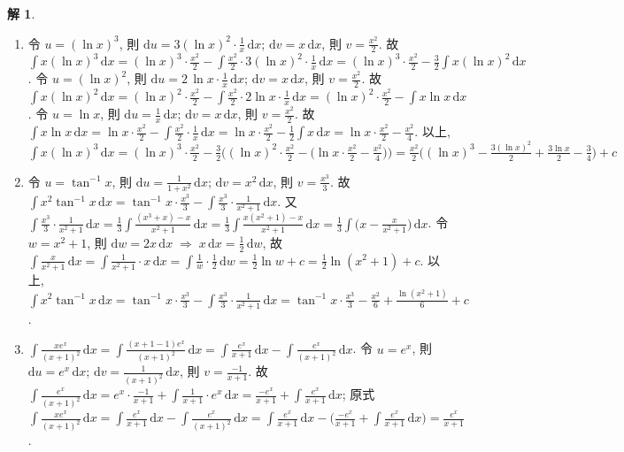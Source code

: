 \documentclass[12pt]{extarticle}
\newcommand{\ds}{\displaystyle}
\newcommand{\ie}{\;\Longrightarrow\;}
\theoremstyle{definition}
\newtheorem*{sol}{解}
\begin{document}
\begin{sol}
\begin{enumerate}
    \item 令 $\ds u = (\ln x)^3$, 則 $\ds\text{d}u = 3(\ln x)^2\cdot\frac{1}{x}\,\text{d}x$; $\ds\text{d}v = x\,\text{d}x$, 則 $\ds v = \frac{x^2}{2}$.  故 $\ds\int x(\ln x)^3\,\text{d}x = (\ln x)^3\cdot\frac{x^2}{2} - \int\!\frac{x^2}{2}\cdot 3(\ln x)^2\cdot\frac{1}{x}\,\text{d}x = (\ln x)^3\cdot\frac{x^2}{2} - \frac{3}{2}\int x(\ln x)^2\,\text{d}x$. 令 $\ds u = (\ln x)^2$, 則 $\ds\text{d}u = 2\,\ln x\cdot\frac{1}{x}\,\text{d}x$; $\ds\text{d}v = x\,\text{d}x$, 則 $\ds v = \frac{x^2}{2}$.  故 $\ds\int x(\ln x)^2\,\text{d}x = (\ln x)^2\cdot\frac{x^2}{2} - \int\!\frac{x^2}{2}\cdot 2\ln x\cdot\frac{1}{x}\,\text{d}x = (\ln x)^2\cdot\frac{x^2}{2} - \int x\ln x\,\text{d}x$. 令 $\ds u = \ln x$, 則 $\ds\text{d}u = \frac{1}{x}\,\text{d}x$; $\ds\text{d}v = x\,\text{d}x$, 則 $\ds v = \frac{x^2}{2}$. 故 $\ds\int x\ln x\,\text{d}x = \ln x\cdot\frac{x^2}{2} - \int\!\frac{x^2}{2}\cdot\frac{1}{x}\,\text{d}x = \ln x\cdot\frac{x^2}{2} - \frac{1}{2}\int x\,\text{d}x = \ln x\cdot\frac{x^2}{2} - \frac{x^2}{4}$. 以上, $\ds\int x(\ln x)^3\,\text{d}x = (\ln x)^3\cdot\frac{x^2}{2} - \frac{3}{2}\Big((\ln x)^2\cdot\frac{x^2}{2} - \big(\ln x\cdot\frac{x^2}{2} - \frac{x^2}{4}\big)\Big) = \frac{x^2}{2}\big((\ln x)^3 - \frac{3(\ln x)^2}{2} + \frac{3\ln x}{2} - \frac{3}{4}\big) + c$
    \item 令 $\ds u = \tan^{-1} x$, 則 $\ds\text{d}u = \frac{1}{1 + x^2}\,\text{d}x$; $\ds\text{d}v = x^2\,\text{d}x$, 則 $\ds v = \frac{x^3}{3}$.  故 $\ds\int x^2\tan^{-1} x\,\text{d}x = \tan^{-1}x\cdot\frac{x^3}{3} - \int\!\frac{x^3}{3}\cdot\frac{1}{x^2 + 1}\,\text{d}x$. 又 $\ds\int\!\frac{x^3}{3}\cdot\frac{1}{x^2 + 1}\,\text{d}x = \frac{1}{3}\int\!\frac{(x^3 + x) - x}{x^2 + 1}\,\text{d}x = \frac{1}{3}\int\!\frac{x(x^2 + 1) - x}{x^2 + 1}\,\text{d}x = \frac{1}{3}\int\!\big(x - \frac{x}{x^2 + 1}\big)\,\text{d}x$. 令 $\ds w = x^2 + 1$, 則 $\ds\text{d}w = 2x\,\text{d}x\ie x\,\text{d}x = \frac{1}{2}\,\text{d}w$, 故 $\ds\int\!\frac{x}{x^2 + 1}\,\text{d}x = \int\!\frac{1}{x^2 + 1}\cdot x\,\text{d}x = \int\!\frac{1}{w}\cdot\frac{1}{2}\,\text{d}w = \frac{1}{2}\ln w + c = \frac{1}{2}\ln(x^2 + 1) + c$. 以上, $\ds\int x^2\tan^{-1} x\,\text{d}x = \tan^{-1}x\cdot\frac{x^3}{3} - \int\!\frac{x^3}{3}\cdot\frac{1}{x^2 + 1}\,\text{d}x = \tan^{-1}x\cdot\frac{x^3}{3} - \frac{x^2}{6} + \frac{\ln(x^2 + 1)}{6} + c$. 
    \item $\ds\int\!\frac{x e^x}{(x + 1)^2}\,\text{d}x = \int\!\frac{(x + 1 - 1)e^x}{(x + 1)^2}\,\text{d}x = \int\!\frac{e^x}{x + 1}\,\text{d}x - \int\!\frac{e^x}{(x + 1)^2}\,\text{d}x$. 令 $\ds u = e^x$, 則 $\ds\text{d}u = e^x\,\text{d}x$; $\ds\text{d}v = \frac{1}{(x + 1)^2}\,\text{d}x$, 則 $\ds v = \frac{-1}{x + 1}$. 故 $\ds\int\!\frac{e^x}{(x + 1)^2}\,\text{d}x = e^x\cdot\frac{-1}{x + 1} + \int\!\frac{1}{x + 1}\cdot e^x\,\text{d}x = \frac{-e^x}{x + 1} + \int\!\frac{e^x}{x + 1}\,\text{d}x$; 原式 $\ds\int\!\frac{x e^x}{(x + 1)^2}\,\text{d}x = \int\!\frac{e^x}{x + 1}\,\text{d}x - \int\!\frac{e^x}{(x + 1)^2}\,\text{d}x = \int\!\frac{e^x}{x + 1}\,\text{d}x - \Big(\frac{-e^x}{x + 1} + \int\!\frac{e^x}{x + 1}\,\text{d}x\Big) = \frac{e^x}{x + 1}$. 

\end{enumerate}
\end{sol}
\end{document}
